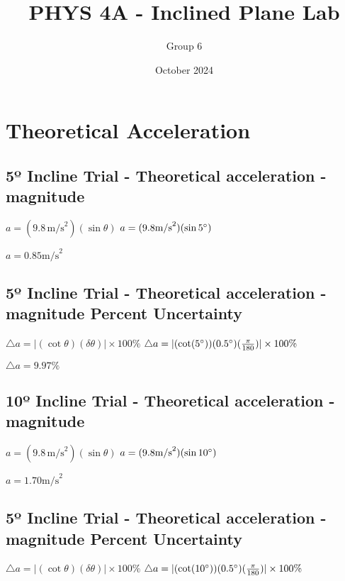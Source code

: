 \documentclass{article}
\title{PHYS 4A - Inclined Plane Lab}
\author{Group 6}
\date{October 2024}
\begin{document}
\maketitle

\section{Theoretical Acceleration}
\subsection{5º Incline Trial - Theoretical acceleration - magnitude}
$a = (9.8 \, \text {m/s}^2) (\sin\theta)$
\newline 
$a = (9.8 \text {m/s}^2)(\sin {5}{\degree})$
\newline 




$a = 0.85 \text {m/s}^2$
\[
\]
\subsection{5º Incline Trial - Theoretical acceleration - magnitude Percent Uncertainty}
$\triangle a = |(\cot \theta)(\delta \theta)| \times {100} \%$
\newline
$\triangle a = |(\cot ({5\degree}))({0.5\degree})(\frac {\pi}{180})| \times {100} \%$
\newline 





$\triangle a = {9.97} \%$
\subsection{10º Incline Trial - Theoretical acceleration - magnitude}
$a = (9.8 \, \text {m/s}^2) (\sin\theta)$
\newline 
$a = (9.8 \text {m/s}^2)(\sin {10}{\degree})$
\newline 




$a = 1.70 \text {m/s}^2$
\[
\]
\subsection{5º Incline Trial - Theoretical acceleration - magnitude Percent Uncertainty}
$\triangle a = |(\cot \theta)(\delta \theta)| \times {100} \%$
\newline
$\triangle a = |(\cot ({10\degree}))({0.5\degree})(\frac {\pi}{180})| \times {100} \%$
\newline 
\end{document}
